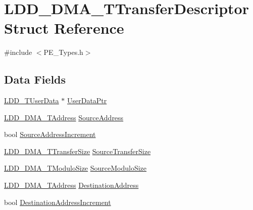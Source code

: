 \hypertarget{struct_l_d_d___d_m_a___t_transfer_descriptor}{\section{L\-D\-D\-\_\-\-D\-M\-A\-\_\-\-T\-Transfer\-Descriptor Struct Reference}
\label{struct_l_d_d___d_m_a___t_transfer_descriptor}
}


{\ttfamily \#include $<$P\-E\-\_\-\-Types.\-h$>$}

\subsection*{Data Fields}
\begin{DoxyCompactItemize}
\item 
\hyperlink{group___p_e___types__module_ga0b66a73f87238a782318aa0be7578e35}{L\-D\-D\-\_\-\-T\-User\-Data} $\ast$ \hyperlink{struct_l_d_d___d_m_a___t_transfer_descriptor_a4136d6742944c7b04a94695c78b581b8}{User\-Data\-Ptr}
\item 
\hyperlink{group___p_e___types__module_gab8287f62db7ff96992355760b652cd07}{L\-D\-D\-\_\-\-D\-M\-A\-\_\-\-T\-Address} \hyperlink{struct_l_d_d___d_m_a___t_transfer_descriptor_a1f204488d1a8b0c542fb7523f604b5e3}{Source\-Address}
\item 
bool \hyperlink{struct_l_d_d___d_m_a___t_transfer_descriptor_afd5e0566912bf5b706cd350519ad77c6}{Source\-Address\-Increment}
\item 
\hyperlink{group___p_e___types__module_ga868f08f9448e5df27a38314f0893d84a}{L\-D\-D\-\_\-\-D\-M\-A\-\_\-\-T\-Transfer\-Size} \hyperlink{struct_l_d_d___d_m_a___t_transfer_descriptor_a96068433ffe065c3fa85f7d2f9a9b545}{Source\-Transfer\-Size}
\item 
\hyperlink{group___p_e___types__module_gacf2f2d4310e7634351c68e1f64a4c483}{L\-D\-D\-\_\-\-D\-M\-A\-\_\-\-T\-Modulo\-Size} \hyperlink{struct_l_d_d___d_m_a___t_transfer_descriptor_a65316d477535d064953174d3eb7eadfe}{Source\-Modulo\-Size}
\item 
\hyperlink{group___p_e___types__module_gab8287f62db7ff96992355760b652cd07}{L\-D\-D\-\_\-\-D\-M\-A\-\_\-\-T\-Address} \hyperlink{struct_l_d_d___d_m_a___t_transfer_descriptor_a36982f9f85fdeab04f7942d173f9bcb7}{Destination\-Address}
\item 
bool \hyperlink{struct_l_d_d___d_m_a___t_transfer_descriptor_a4f0e7ef5b8fc25661c26ded1e89a1c95}{Destination\-Address\-Increment}
\item 

\end{DoxyCompactItemize}
